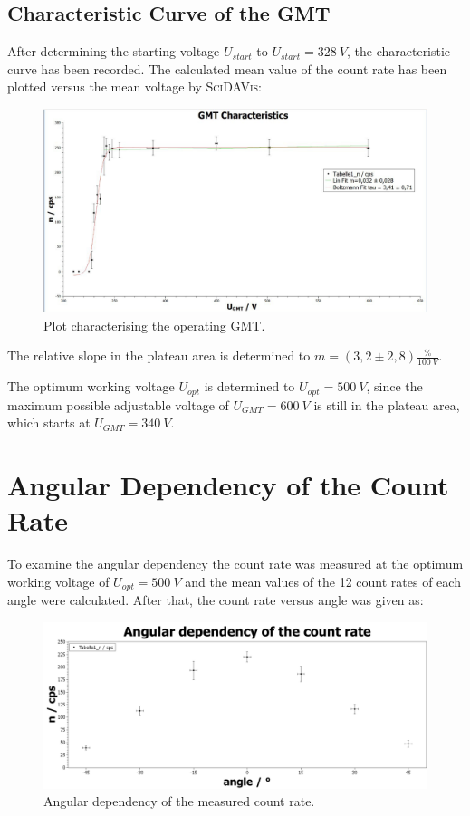 \subsection{Characteristic Curve of the GMT}
%
After determining the starting voltage \(U_{start}\) to \(U_{start}=\SI{328}{V}\), the characteristic curve has been
recorded. The calculated mean value
of the count rate has been plotted versus the mean voltage by \textsc{SciDAVis}:\par
\begin{figure}[H]
 \centering
 \includegraphics[width=.9\textwidth]{scidavis/Fig.6_GMT-characteristics.jpg}
 \caption[GMT characteristic]{Plot characterising the operating GMT.}
 \label{fig:gmtCharacteristics}
\end{figure}
The relative slope in the plateau area is determined to \(m=(3,2 \pm 2,8) \frac{\%}{\SI{100}{V}}\).\par
The optimum working voltage \(U_{opt}\) is determined to \(U_{opt}=\SI{500}{V}\), since the maximum possible adjustable
voltage of \(U_{GMT}=\SI{600}{V}\) is still in the plateau area, which starts at \(U_{GMT}=\SI{340}{V}\).
%
\section{Angular Dependency of the Count Rate}
To examine the angular dependency the count rate was measured at the optimum working voltage of
\(U_{opt}=\SI{500}{V}\) and the mean values of the 12 count rates of each angle were calculated. After that, the count
rate versus angle was given as:\par
\begin{figure}[H]
 \centering
 \includegraphics[width=.8\textwidth]{scidavis/Fig.7_Angular dependency of the count rate.jpg}
 \caption[Angular dependency of cps]{Angular dependency of the measured count rate.}
 \label{fig:angularDepCPS}
\end{figure}
%
